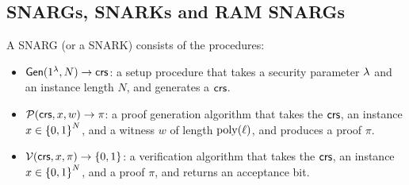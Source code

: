 \subsection{SNARGs, SNARKs and RAM SNARGs}
A SNARG (or a SNARK) consists of the procedures:
\begin{itemize}
    \item $\mathsf{Gen}(1^\lambda, N)\to \mathsf{crs}$: a setup procedure that takes a security parameter $\lambda$ and an instance length $N$, and generates a $\mathsf{crs}$.
    \item $\mathcal{P}(\mathsf{crs}, x, w)\to \pi$: a proof generation algorithm that takes the $\mathsf{crs}$, an instance $x\in\left \{{0,1} \right \}^N$, and a witness $w$ of length $\operatorname{poly}(\ell)$, 	and produces a proof $\pi$.
    \item $\mathcal{V}(\mathsf{crs}, x, \pi)\to \left \{{0,1} \right \}$: a verification algorithm that takes the $\mathsf{crs}$, an instance $x\in\left \{{0,1} \right \}^N$, and a proof $\pi$, and returns an acceptance bit.
\end{itemize}
